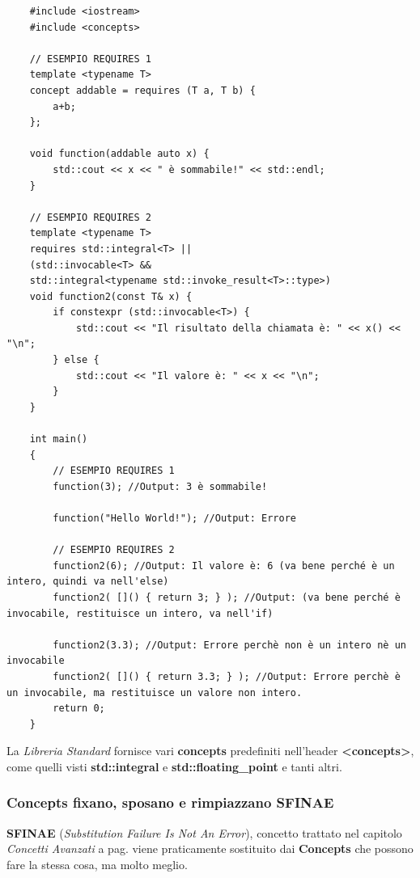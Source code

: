 \begin{lstlisting}
	#include <iostream>
	#include <concepts>
	
	// ESEMPIO REQUIRES 1
	template <typename T>
	concept addable = requires (T a, T b) {
		a+b;
	};
	
	void function(addable auto x) {
		std::cout << x << " è sommabile!" << std::endl;    
	}

	// ESEMPIO REQUIRES 2
	template <typename T>
	requires std::integral<T> ||
	(std::invocable<T> &&
	std::integral<typename std::invoke_result<T>::type>)
	void function2(const T& x) {
		if constexpr (std::invocable<T>) {
			std::cout << "Il risultato della chiamata è: " << x() << "\n";
		} else {
			std::cout << "Il valore è: " << x << "\n";
		}
	}
	
	int main()
	{
		// ESEMPIO REQUIRES 1
		function(3); //Output: 3 è sommabile!
		
		function("Hello World!"); //Output: Errore
		
		// ESEMPIO REQUIRES 2
		function2(6); //Output: Il valore è: 6 (va bene perché è un intero, quindi va nell'else)
		function2( []() { return 3; } ); //Output: (va bene perché è invocabile, restituisce un intero, va nell'if)
		
		function2(3.3); //Output: Errore perchè non è un intero nè un invocabile
		function2( []() { return 3.3; } ); //Output: Errore perchè è un invocabile, ma restituisce un valore non intero.
		return 0;
	}
\end{lstlisting}

\textsf{\small La \emph{Libreria Standard} fornisce vari \textbf{concepts} predefiniti nell'header \textbf{<concepts>}, come quelli visti \textbf{std::integral} e \textbf{std::floating\_point} e tanti altri.} \\


\subsubsection{Concepts fixano, sposano e rimpiazzano SFINAE}

\textsf{\small \textbf{SFINAE} (\emph{Substitution Failure Is Not An Error}), concetto trattato nel capitolo \emph{Concetti Avanzati} a pag.\textbf{\pageref{SFINAE}} viene praticamente sostituito dai \textbf{Concepts} che possono fare la stessa cosa, ma molto meglio.} \\

